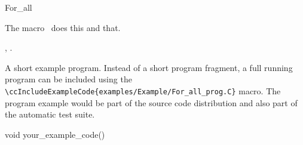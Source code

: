 

\begin{ccRefMacro}{For_all}  %


\ccDefinition
  
The macro \ccRefName\ does this and that.



\ccIsModel


\ccSeeAlso

,
.

\ccExample

A short example program.
Instead of a short program fragment, a full running program can be
included using the 
\verb|\ccIncludeExampleCode{examples/Example/For_all_prog.C}| 
macro. The program example would be part of the source code distribution and
also part of the automatic test suite.

\begin{ccExampleCode}
void your_example_code() {
}
\end{ccExampleCode}


\end{ccRefMacro}


